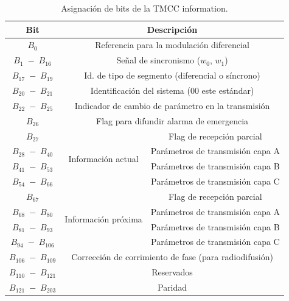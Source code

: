 \begin{table}[h!]
\centering
\begin{tabular}{|c|c|c|}
\hline
\textbf{Bit} 	& \multicolumn{2}{|c|}{\textbf{Descripción}} \\
\hline
$B_0$ & \multicolumn{2}{|c|}{Referencia para la modulaci\'on diferencial} \\
 \hline
$B_1 \; - \; B_{16}$ & \multicolumn{2}{|c|}{Señal de sincronismo ($w_0$, $w_1$)} \\
 \hline
$B_{17} \; - \; B_{19}$ & \multicolumn{2}{|c|}{Id. de tipo de segmento (diferencial o síncrono)} \\
 \hline
$B_{20} \; - \; B_{21}$ & \multicolumn{2}{|c|}{Identificación del sistema (00 este estándar)} \\
 \hline
$B_{22} \; - \; B_{25}$ & \multicolumn{2}{|c|}{Indicador de cambio de parámetro en la transmisión} \\
 \hline
$B_{26}$ & \multicolumn{2}{|c|}{Flag para difundir alarma de emergencia} \\
 \hline
$B_{27}$ & \multirow{4}{*}{Informaci\'on actual} & Flag de recepción parcial\\
 \cline{3-3} \cline{1-1}
$B_{28} \; - \; B_{40}$ &  & Parámetros de transmisión capa A \\
 \cline{3-3} \cline{1-1}
 $B_{41} \; - \; B_{53}$ & & Parámetros de transmisión capa B \\
 \cline{3-3} \cline{1-1}
 $B_{54} \; - \; B_{66}$ &  & Parámetros de transmisión capa C \\
 \hline
 $B_{67}$ & \multirow{4}{*}{Informaci\'on pr\'oxima} & Flag de recepción parcial\\
 \cline{3-3} \cline{1-1}
$B_{68} \; - \; B_{80}$ &  & Parámetros de transmisión capa A \\
 \cline{3-3} \cline{1-1}
 $B_{81} \; - \; B_{93}$ & & Parámetros de transmisión capa B \\
 \cline{3-3} \cline{1-1}
 $B_{94} \; - \; B_{106}$ &  & Parámetros de transmisión capa C \\
 \hline
  $B_{106} \; - \; B_{109}$ &  \multicolumn{2}{|c|}{Correcci\'on de corrimiento de fase (para radiodifusi\'on)}  \\
 \hline
  $B_{110} \; - \; B_{121}$ &  \multicolumn{2}{|c|}{Reservados}  \\
 \hline
   $B_{121} \; - \; B_{203}$ &  \multicolumn{2}{|c|}{Paridad}  \\
 \hline  
\end{tabular}
\caption{\label{t:bits_TMCC} Asignación de bits de la TMCC information.}
\end{table}

